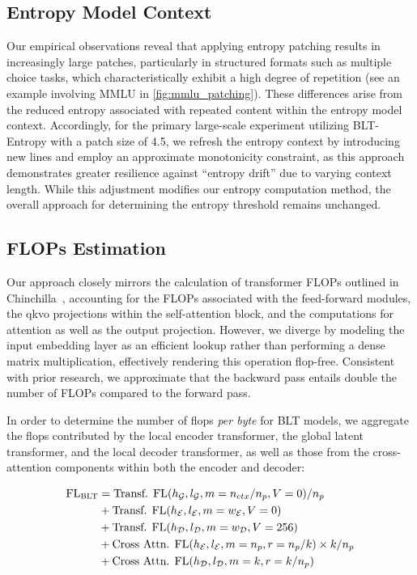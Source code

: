 \subsection{Entropy Model Context}
\label{section:entropy-context}
Our empirical observations reveal that applying entropy patching results in increasingly large patches, particularly in structured formats such as multiple choice tasks, which characteristically exhibit a high degree of repetition (see an example involving MMLU in \autoref{fig:mmlu_patching}). These differences arise from the reduced entropy associated with repeated content within the entropy model context. Accordingly, for the primary large-scale experiment utilizing {\textsc BLT}-Entropy with a patch size of 4.5, we refresh the entropy context by introducing new lines and employ an approximate monotonicity constraint, as this approach demonstrates greater resilience against “entropy drift” due to varying context length. While this adjustment modifies our entropy computation method, the overall approach for determining the entropy threshold remains unchanged.

\subsection{FLOPs Estimation} 
\label{section:flops}

Our approach closely mirrors the calculation of transformer FLOPs outlined in Chinchilla~\citep{hoffmann2022training}, accounting for the FLOPs associated with the feed-forward modules, the qkvo projections within the self-attention block, and the computations for attention as well as the output projection. However, we diverge by modeling the input embedding layer as an efficient lookup rather than performing a dense matrix multiplication, effectively rendering this operation flop-free. Consistent with prior research, we approximate that the backward pass entails double the number of FLOPs compared to the forward pass.

In order to determine the number of flops \textit{per byte} for {\textsc BLT} models, we aggregate the flops contributed by the local encoder transformer, the global latent transformer, and the local decoder transformer, as well as those from the cross-attention components within both the encoder and decoder:

\begin{align}
    \text{FL}_{\text{{\textsc BLT}}} &= \text{Transf. FL}(h_{\mathcal{G}}, l_{\mathcal{G}}, m=n_{ctx}/n_p,V=0) / n_p\\
   &+\text{Transf. FL}(h_{\mathcal{E}}, l_{\mathcal{E}}, m=w_{\mathcal{E}}, V=0) \\
   &+ \text{Transf. FL}(h_{\mathcal{D}}, l_{\mathcal{D}}, m=w_{\mathcal{D}}, V=256) \\ 
    &+ \text{Cross Attn. FL}(h_{\mathcal{E}}, l_{\mathcal{E}}, m=n_p, r=n_p/k) \times k/n_p \\ 
   &+ \text{Cross Attn. FL}(h_{\mathcal{D}}, l_{\mathcal{D}}, m=k, r=k/n_p) 
\end{align}

